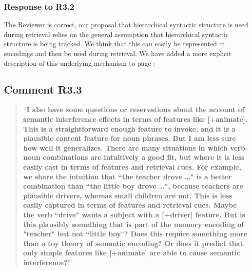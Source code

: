 \documentclass[12pt]{article}
\begin{document}
\subsubsection*{Response to R3.2}
The Reviewer is correct, our proposal that hierarchical syntactic structure is used during retrieval relies on the general assumption that hierarchical syntactic structure is being tracked. We think that this can easily be represented in encodings and then be used during retrieval. We have added a more explicit description of this underlying mechanism to page \pageref{clause_tracker}:

\begin{quote}
\end{quote}

\subsection*{Comment R3.3}
\begin{quote}
``\textbf{I also have some questions or reservations about the account of semantic interference effects in terms of features like [+animate]. This is a straightforward enough feature to invoke, and it is a plausible content feature for noun phrases. But I am less sure how well it generalizes. There are many situations in which verb-noun combinations are intuitively a good fit, but where it is less easily cast in terms of features and retrieval cues. For example, we share the intuition that ``the teacher drove …" is a better combination than ``the little boy drove …", because teachers are plausible drivers, whereas small children are not. This is less easily captured in terms of features and retrieval cues. Maybe the verb ``drive" wants a subject with a [+driver] feature. But is this plausibly something that is part of the memory encoding of "teacher" but not ``little boy"? Does this require something more than a toy theory of semantic encoding? Or does it predict that only simple features like [+animate] are able to cause semantic interference?}''
\end{quote}
\end{document}

